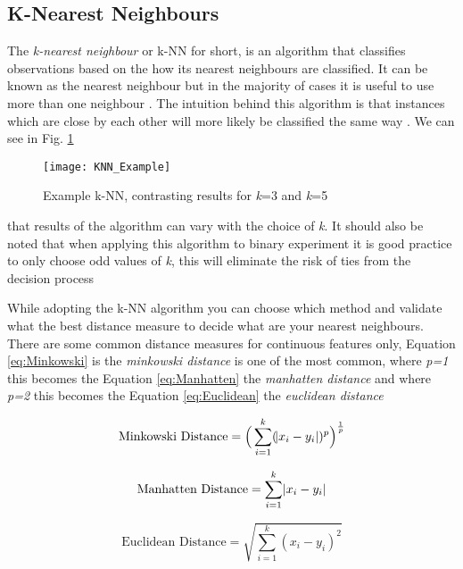 \subsection{K-Nearest Neighbours} \label{kNN}
The \textit{k-nearest neighbour} or {k-NN} for short, is an algorithm that classifies observations based on the how its nearest neighbours are classified. It can be known as the nearest neighbour but in the majority of cases it is useful to use more than one neighbour \citep{henley_k-nearest-neighbour_1996}. The intuition behind this algorithm is that instances which are close by each other will more likely be classified the same way \citep{cover_nearest_1967}. We can see in Fig. \ref{fig:KNN_Example}\\ %


\begin{figure}[H]
	\texttt{[image: KNN\_Example]}
	\caption{Example k-NN, contrasting results for \textit{k}=3 and \textit{k}=5 }
	\label{fig:KNN_Example}
\end{figure}

that results of the algorithm can vary with the choice of \textit{k}. It should also be noted that when applying this algorithm to binary experiment it is good practice to only choose odd values of \textit{k}, this will eliminate the risk of ties from the decision process \citep{keller_fuzzy_1985} 

While adopting the k-NN algorithm you can choose which method and validate what the best distance measure to decide what are your nearest neighbours. There are some common distance measures for continuous features only, Equation \ref{eq:Minkowski} is the \textit{minkowski distance} is one of the most common, where \textit{p=1} this becomes the Equation \ref{eq:Manhatten} the \textit{manhatten distance} and where \textit{p=2} this becomes the Equation \ref{eq:Euclidean} the \textit{euclidean distance}

\begin{equation} \label{eq:Minkowski}
	\text{Minkowski Distance}   = \Big(\sum_{i=1}^k (\abs{x_i-y_i})^p\Big)^\frac{1}{p}
\end{equation}

\begin{equation} \label{eq:Manhatten}
	\text{Manhatten Distance}   = \sum_{i=1}^k \abs{x_i-y_i}
\end{equation}

\begin{equation} \label{eq:Euclidean}
	\text{Euclidean Distance}   = \sqrt{\sum_{i=1}^k (x_i-y_i)^2}
\end{equation}

